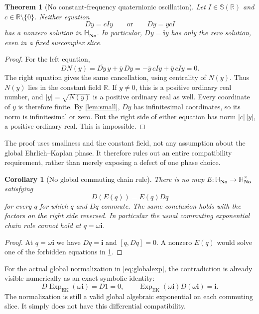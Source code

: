 \documentclass[11pt,letterpaper]{article}
\numberwithin{equation}{section}
\newtheorem{theorem}{Theorem}[section]
\newtheorem{corollary}[corollary]{Corollary}
\theoremstyle{definition}
\theoremstyle{remark}
\newcommand{\No}{\mathbf{No}}
\newcommand{\SQ}{\mathbb H_{\No}}
\newcommand{\R}{\mathbb R}
\newcommand{\ii}{\mathbf i}
\newcommand{\Exp}{\operatorname{Exp}}
\begin{document}
\begin{theorem}[No constant-frequency quaternionic oscillation]\label{thm:nooscillation}
Let $I\in\mathbb S(\R)$ and $c\in\R\setminus\{0\}$. Neither equation
\begin{equation}\label{eq:oscillation}
 Dy=cIy\qquad\text{or}\qquad Dy=ycI
\end{equation}
has a nonzero solution in $\SQ$. In particular, $Dy=\ii y$ has only the zero solution, even
in a fixed surcomplex slice.
\end{theorem}
\begin{proof}
For the left equation,
\[
 D N(y)=\overline{Dy}\,y+\bar y\,Dy
       =-\bar y\,cI y+\bar y\,cI y=0.
\]
The right equation gives the same cancellation, using centrality of $N(y)$.
Thus $N(y)$ lies in the constant field $\R$. If $y\ne0$, this is a positive ordinary real
number, and $|y|=\sqrt{N(y)}$ is a positive ordinary real as well. Every coordinate of $y$
is therefore finite. By \cref{lem:small}, $Dy$ has infinitesimal coordinates, so its norm is
infinitesimal or zero. But the right side of either equation has norm $|c|\,|y|$, a positive
ordinary real. This is impossible.
\end{proof}

The proof uses smallness and the constant field, not any assumption about the global
Ehrlich--Kaplan phase. It therefore rules out an entire compatibility requirement, rather
than merely exposing a defect of one phase choice.

\begin{corollary}[No global commuting chain rule]\label{cor:nochain}
There is no map $E:\SQ\to\SQ^\times$ satisfying
\[
 D(E(q))=E(q)Dq
\]
for every $q$ for which $q$ and $Dq$ commute. The same conclusion holds with the factors
on the right side reversed. In particular the usual commuting exponential chain rule cannot
hold at $q=\omega\ii$.
\end{corollary}
\begin{proof}
At $q=\omega\ii$ we have $Dq=\ii$ and $[q,Dq]=0$. A nonzero $E(q)$ would solve one of the
forbidden equations in \cref{thm:nooscillation}.
\end{proof}

For the actual global normalization in \eqref{eq:globalexp}, the contradiction is already
visible numerically as an exact symbolic identity:
\[
 D\Exp_{\mathrm{EK}}(\omega\ii)=D1=0,
 \qquad \Exp_{\mathrm{EK}}(\omega\ii)D(\omega\ii)=\ii.
\]
The normalization is still a valid global algebraic exponential on each commuting slice.
It simply does not have this differential compatibility.
\end{document}
